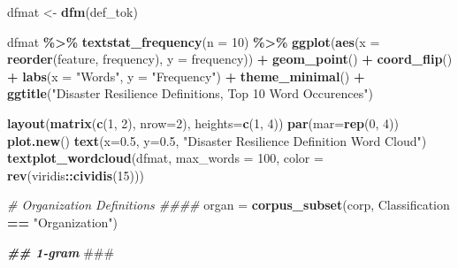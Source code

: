 \documentclass[
]{article}
\newenvironment{Shaded}{\begin{snugshade}}{\end{snugshade}}
\newcommand{\AlertTok}[1]{\textcolor[rgb]{0.94,0.16,0.16}{#1}}
\newcommand{\AttributeTok}[1]{\textcolor[rgb]{0.13,0.29,0.53}{#1}}
\newcommand{\CommentTok}[1]{\textcolor[rgb]{0.56,0.35,0.01}{\textit{#1}}}
\newcommand{\DecValTok}[1]{\textcolor[rgb]{0.00,0.00,0.81}{#1}}
\newcommand{\DocumentationTok}[1]{\textcolor[rgb]{0.56,0.35,0.01}{\textbf{\textit{#1}}}}
\newcommand{\FloatTok}[1]{\textcolor[rgb]{0.00,0.00,0.81}{#1}}
\newcommand{\FunctionTok}[1]{\textcolor[rgb]{0.13,0.29,0.53}{\textbf{#1}}}
\newcommand{\NormalTok}[1]{#1}
\newcommand{\OtherTok}[1]{\textcolor[rgb]{0.56,0.35,0.01}{#1}}
\newcommand{\SpecialCharTok}[1]{\textcolor[rgb]{0.81,0.36,0.00}{\textbf{#1}}}
\newcommand{\StringTok}[1]{\textcolor[rgb]{0.31,0.60,0.02}{#1}}
\begin{document}
\begin{Shaded}
\begin{Highlighting}[]
\NormalTok{dfmat }\OtherTok{\textless{}{-}} \FunctionTok{dfm}\NormalTok{(def\_tok)}

\NormalTok{dfmat }\SpecialCharTok{\%\textgreater{}\%} 
  \FunctionTok{textstat\_frequency}\NormalTok{(}\AttributeTok{n =} \DecValTok{10}\NormalTok{) }\SpecialCharTok{\%\textgreater{}\%} 
  \FunctionTok{ggplot}\NormalTok{(}\FunctionTok{aes}\NormalTok{(}\AttributeTok{x =} \FunctionTok{reorder}\NormalTok{(feature, frequency), }\AttributeTok{y =}\NormalTok{ frequency)) }\SpecialCharTok{+}
  \FunctionTok{geom\_point}\NormalTok{() }\SpecialCharTok{+}
  \FunctionTok{coord\_flip}\NormalTok{() }\SpecialCharTok{+}
  \FunctionTok{labs}\NormalTok{(}\AttributeTok{x =} \StringTok{"Words"}\NormalTok{, }\AttributeTok{y =} \StringTok{"Frequency"}\NormalTok{) }\SpecialCharTok{+}
  \FunctionTok{theme\_minimal}\NormalTok{() }\SpecialCharTok{+} 
  \FunctionTok{ggtitle}\NormalTok{(}\StringTok{"Disaster Resilience Definitions, Top 10 Word Occurences"}\NormalTok{)}

\FunctionTok{layout}\NormalTok{(}\FunctionTok{matrix}\NormalTok{(}\FunctionTok{c}\NormalTok{(}\DecValTok{1}\NormalTok{, }\DecValTok{2}\NormalTok{), }\AttributeTok{nrow=}\DecValTok{2}\NormalTok{), }\AttributeTok{heights=}\FunctionTok{c}\NormalTok{(}\DecValTok{1}\NormalTok{, }\DecValTok{4}\NormalTok{))}
\FunctionTok{par}\NormalTok{(}\AttributeTok{mar=}\FunctionTok{rep}\NormalTok{(}\DecValTok{0}\NormalTok{, }\DecValTok{4}\NormalTok{))}
\FunctionTok{plot.new}\NormalTok{()}
\FunctionTok{text}\NormalTok{(}\AttributeTok{x=}\FloatTok{0.5}\NormalTok{, }\AttributeTok{y=}\FloatTok{0.5}\NormalTok{, }\StringTok{"Disaster Resilience Definition Word Cloud"}\NormalTok{)}
\FunctionTok{textplot\_wordcloud}\NormalTok{(dfmat, }\AttributeTok{max\_words =} \DecValTok{100}\NormalTok{, }\AttributeTok{color =} \FunctionTok{rev}\NormalTok{(viridis}\SpecialCharTok{::}\FunctionTok{cividis}\NormalTok{(}\DecValTok{15}\NormalTok{)))}

\CommentTok{\# Organization Definitions \#\#\#\#}
\NormalTok{organ }\OtherTok{=} \FunctionTok{corpus\_subset}\NormalTok{(corp, Classification }\SpecialCharTok{==} \StringTok{"Organization"}\NormalTok{)}

\DocumentationTok{\#\# 1{-}gram }\AlertTok{\#\#\#}


\end{Highlighting}
\end{Shaded}
\end{document}
